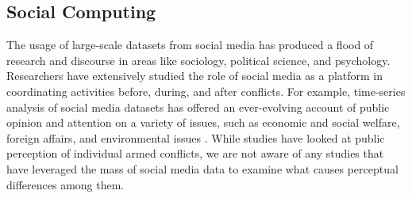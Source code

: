 \subsection{Social Computing}
The usage of large-scale datasets from social media has produced a flood of research and discourse in areas like sociology, political science, and psychology. Researchers have extensively studied the role of social media as a platform in coordinating activities before, during, and after conflicts. For example, time-series analysis of social media datasets has offered an ever-evolving account of public opinion and attention on a variety of issues, such as economic and social welfare, foreign affairs, and environmental issues \cite{RussellNeuman2014}. While studies have looked at public perception of individual armed conflicts, we are not aware of any studies that have leveraged the mass of social media data to examine what causes perceptual differences among them.
